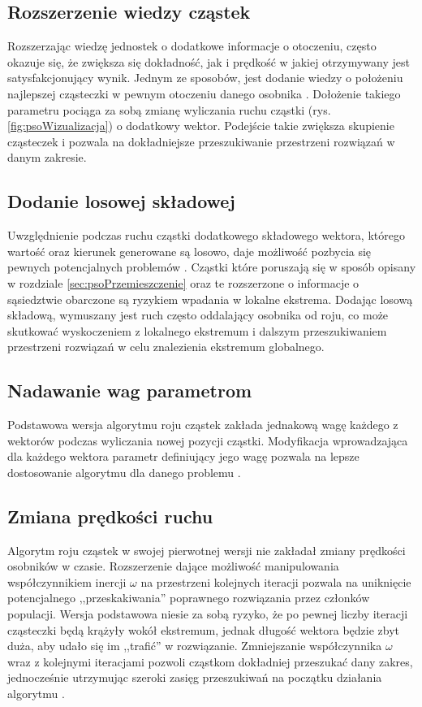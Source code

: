 \subsection*{Rozszerzenie wiedzy cząstek}
\label{sec:psoSasiedztwo}
Rozszerzając wiedzę jednostek o dodatkowe informacje o otoczeniu, często okazuje się, że zwiększa się dokładność, jak i prędkość w jakiej otrzymywany jest satysfakcjonujący wynik. Jednym ze sposobów, jest dodanie wiedzy o położeniu najlepszej cząsteczki w pewnym otoczeniu danego osobnika \cite{PSOneighbourhood}. Dołożenie takiego parametru pociąga za sobą zmianę wyliczania ruchu cząstki (rys. \ref{fig:psoWizualizacja}) o dodatkowy wektor. Podejście takie zwiększa skupienie cząsteczek i pozwala na dokładniejsze przeszukiwanie przestrzeni rozwiązań w danym zakresie. 


\subsection*{Dodanie losowej składowej}
\label{sec:psoLosowa}
Uwzględnienie podczas ruchu cząstki dodatkowego składowego wektora, którego wartość oraz kierunek generowane są losowo, daje możliwość pozbycia się pewnych potencjalnych problemów \cite{PSOrandom}. Cząstki które poruszają się w sposób opisany w rozdziale \ref{sec:psoPrzemieszczenie} oraz te rozszerzone o informacje o sąsiedztwie obarczone są ryzykiem wpadania w lokalne ekstrema. Dodając losową składową, wymuszany jest ruch często oddalający osobnika od roju, co może skutkować wyskoczeniem z lokalnego ekstremum i dalszym przeszukiwaniem przestrzeni rozwiązań w celu znalezienia ekstremum globalnego.


\subsection*{Nadawanie wag parametrom}
\label{sec:psoWagi}
Podstawowa wersja algorytmu roju cząstek zakłada jednakową wagę każdego z wektorów podczas wyliczania nowej pozycji cząstki. Modyfikacja wprowadzająca dla każdego wektora parametr definiujący jego wagę pozwala na lepsze dostosowanie algorytmu dla danego problemu \cite{PSOparams}.


\subsection*{Zmiana prędkości ruchu}
\label{sec:psoPredkosc}
Algorytm roju cząstek w swojej pierwotnej wersji nie zakładał zmiany prędkości osobników w czasie. Rozszerzenie dające możliwość manipulowania współczynnikiem inercji $\omega$ na przestrzeni kolejnych iteracji pozwala na uniknięcie potencjalnego ,,przeskakiwania'' poprawnego rozwiązania przez członków populacji. Wersja podstawowa niesie za sobą ryzyko, że po pewnej liczby iteracji cząsteczki będą krążyły wokół ekstremum, jednak długość wektora będzie zbyt duża, aby udało się im ,,trafić'' w rozwiązanie. Zmniejszanie współczynnika $\omega$ wraz z kolejnymi iteracjami pozwoli cząstkom dokładniej przeszukać dany zakres, jednocześnie utrzymując szeroki zasięg przeszukiwań na początku działania algorytmu \cite{PSOvelocity}.

